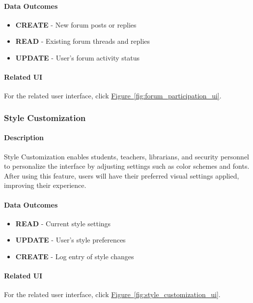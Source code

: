 \documentclass[12pt]{article}
\begin{document}
\paragraph{Data Outcomes}
\begin{itemize}
    \item \textbf{CREATE} - New forum posts or replies
    \item \textbf{READ} - Existing forum threads and replies
    \item \textbf{UPDATE} - User's forum activity status
\end{itemize}

\paragraph{Related UI}
For the related user interface, click \hyperref[fig:forum_participation_ui]{Figure~\ref*{fig:forum_participation_ui}}.

\subsubsection{Style Customization}

\paragraph{Description}
Style Customization enables students, teachers, librarians, and security personnel to personalize the interface by adjusting settings such as color schemes and fonts. After using this feature, users will have their preferred visual settings applied, improving their experience.

\paragraph{Data Outcomes}
\begin{itemize}
    \item \textbf{READ} - Current style settings
    \item \textbf{UPDATE} - User's style preferences
    \item \textbf{CREATE} - Log entry of style changes
\end{itemize}

\paragraph{Related UI}
For the related user interface, click \hyperref[fig:style_customization_ui]{Figure~\ref*{fig:style_customization_ui}}.
\end{document}
